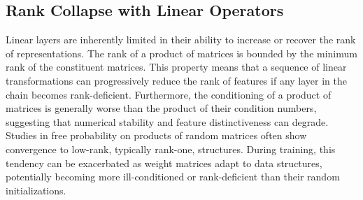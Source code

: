 \documentclass{article}
\begin{document}
\subsection{Rank Collapse with Linear Operators}
Linear layers are inherently limited in their ability to increase or recover the rank of representations. The rank of a product of matrices is bounded by the minimum rank of the constituent matrices. This property means that a sequence of linear transformations can progressively reduce the rank of features if any layer in the chain becomes rank-deficient. Furthermore, the conditioning of a product of matrices is generally worse than the product of their condition numbers, suggesting that numerical stability and feature distinctiveness can degrade. Studies in free probability on products of random matrices often show convergence to low-rank, typically rank-one, structures. During training, this tendency can be exacerbated as weight matrices adapt to data structures, potentially becoming more ill-conditioned or rank-deficient than their random initializations.
\end{document}
